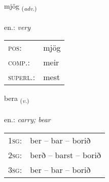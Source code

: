 \documentclass[frontgrid, backgrid]{flacards}\usepackage[]{graphicx}\usepackage[]{xcolor}
\begin{document}
\renewcommand{\flhead}{\vskip5pt \fboxsep=0pt {\small\bfseries\footnotesize Atviksorð | Adverb}}
\renewcommand{\fcfoot}{\vskip5pt \fboxsep=0pt \hspace{2pt}{\small\bfseries\footnotesize 1K}}

\renewcommand{\blhead}{\vskip5pt {\small\bfseries\footnotesize Atviksorð | Adverb }}
\renewcommand{\bcfoot}{\vskip5pt \hspace{2pt}{\small\bfseries\footnotesize 1K}}


{mjög \small{\textsubscript{(\textit{adv.})}} \\[1ex] %
\textphonetic{[mjœːɣ]} \\
en.: \emph{very} \\  [2ex]
\renewcommand*{\arraystretch}{0.8}
\begin{tabular}{ll}
\textsc{pos}: & mjög \\ 
\textsc{comp.}: & meir \\ 
\textsc{superl.}: & mest \\
\end{tabular}
}

\renewcommand{\flhead}{\vskip5pt \fboxsep=0pt {\small\bfseries\footnotesize Sagnorð | Verb}}
\renewcommand{\fcfoot}{\vskip5pt \fboxsep=0pt \hspace{2pt}{\small\bfseries\footnotesize 1K}}

\renewcommand{\blhead}{\vskip5pt {\small\bfseries\footnotesize Sagnorð | Verb }}
\renewcommand{\bcfoot}{\vskip5pt \hspace{2pt}{\small\bfseries\footnotesize 1K}}


{bera \small{\textsubscript{(\textit{v.})}} \\[1ex] %
\textphonetic{[pɛːra]} \\
en.: \emph{carry; bear} \\  [2ex]
\renewcommand*{\arraystretch}{0.8}
\begin{tabular}{p{1cm}l}
\textsc{1sg}: & ber -- bar -- borið \\ 
\textsc{2sg}: & berð -- barst -- borið \\ 
\textsc{3sg}: & ber -- bar -- borið \\ 
\end{tabular}
}
\end{document}
